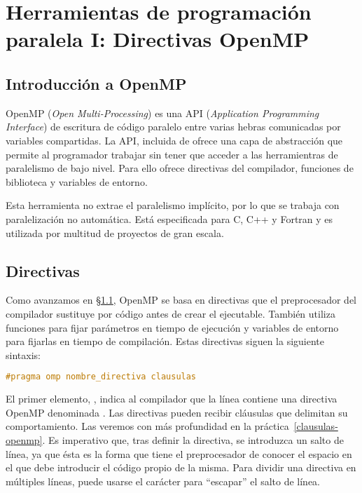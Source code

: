 \chapter{Herramientas de programación paralela I\@: Directivas OpenMP}\label{directivas-openmp}

\section{Introducción a OpenMP}\label{directivas-openmp-introduccion}

OpenMP (\textit{Open Multi-Processing}) es una API (\textit{Application Programming Interface}) de escritura de código paralelo entre varias hebras comunicadas por variables compartidas.
La API, incluida de  ofrece una capa de abstracción que permite al programador trabajar sin tener que acceder a las herramientras de paralelismo de bajo nivel.
Para ello ofrece directivas del compilador, funciones de biblioteca y variables de entorno.

Esta herramienta no extrae el paralelismo implícito, por lo que se trabaja con paralelización no automática.
Está especificada para C, C++ y Fortran y es utilizada por multitud de proyectos de gran escala.

\section{Directivas}\label{directivas-openmp-directivas}

Como avanzamos en \S\ref{directivas-openmp-introduccion}, OpenMP se basa en directivas que el preprocesador del compilador sustituye por código antes de crear el ejecutable.
También utiliza funciones para fijar parámetros en tiempo de ejecución y variables de entorno para fijarlas en tiempo de compilación.
Estas directivas siguen la siguiente sintaxis:

\begin{lstlisting}[language=C]
#pragma omp nombre_directiva clausulas
\end{lstlisting}

El primer elemento, , indica al compilador que la línea contiene una directiva OpenMP denominada .
Las directivas pueden recibir cláusulas que delimitan su comportamiento.
Las veremos con más profundidad en la práctica~\ref{clausulas-openmp}.
Es imperativo que, tras definir la directiva, se introduzca un salto de línea, ya que ésta es la forma que tiene el preprocesador de conocer el espacio en el que debe introducir el código propio de la misma.
Para dividir una directiva en múltiples líneas, puede usarse el carácter \code{\textbackslash} para ``escapar'' el salto de línea.

